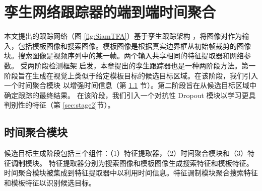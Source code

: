 \section{孪生网络跟踪器的端到端时间聚合}
本文提出的跟踪网络（图 \ref{fig:SiamTFA}）基于孪生跟踪架构 \cite{SiamRPN++, Wang2018SiamMask}，将图像对作为输入，包括模板图像和搜索图像。模板图像是根据真实边界框从初始帧裁剪的图像块。搜索图像是视频序列中的某一帧。两个输入共享相同的特征提取器和网络参数。
受两阶段检测框架 \cite{ren2015faster} 启发，本章提出的孪生跟踪器也是一种两阶段方法。第一阶段旨在生成在视觉上类似于给定模板目标的候选目标区域。在该阶段，我们引入一个时间聚合模块
以增强时间信息（第 \ref{sec:stage1} 节）。第二阶段旨在从候选目标区域中确定跟踪的最终结果。
在该阶段，我们引入一个对抗性 Dropout 模块以学习更具判别性的特征（第 \ref{sec:stage2}节）。

\subsection{时间聚合模块}
\label{sec:stage1}
候选目标生成阶段包括三个组件：（1）特征提取器，（2）时间聚合模块和（3）特征调制模块。
特征提取器分别为搜索图像和模板图像生成搜索特征和模板特征。时间聚合模块被集成到特征提取器中以利用时间信息。特征调制模块聚合搜索特征和模板特征以识别候选目标。

